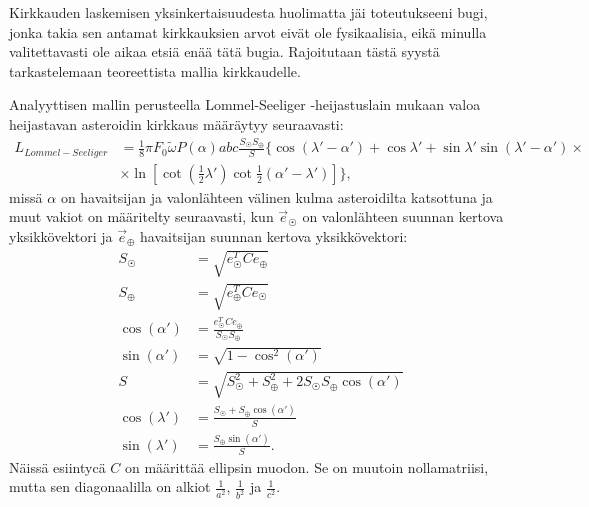 \documentclass[12pt,a4paper,titlepage]{article}
\begin{document}
Kirkkauden laskemisen yksinkertaisuudesta huolimatta jäi toteutukseeni bugi, jonka takia sen antamat kirkkauksien arvot eivät ole fysikaalisia, eikä minulla valitettavasti ole aikaa etsiä enää tätä bugia. Rajoitutaan tästä syystä tarkastelemaan teoreettista mallia kirkkaudelle.

Analyyttisen mallin perusteella Lommel-Seeliger -heijastuslain mukaan valoa heijastavan asteroidin kirkkaus määräytyy seuraavasti:
\begin{align}
	L_{Lommel-Seeliger} &= \frac{1}{8} \pi F_0 \widetilde{\omega} P(\alpha)abc\frac{S_{\astrosun} S_{\oplus}}{S} \{ \cos(\lambda'-\alpha') + \cos\lambda' + \sin \lambda' \sin(\lambda'-\alpha') \times\nonumber\\
	&\times\ln\left[\cot(\frac{1}{2}\lambda')\cot\frac{1}{2}(\alpha'-\lambda')\right] \},
\end{align}
missä $\alpha$ on havaitsijan ja valonlähteen välinen kulma asteroidilta katsottuna ja muut vakiot on määritelty seuraavasti, kun $\vec{e}_{\astrosun}$ on valonlähteen suunnan kertova yksikkövektori ja $\vec{e}_{\oplus}$ havaitsijan suunnan kertova yksikkövektori: 
\begin{align*}
	S_{\astrosun} &= \sqrt{e_{\astrosun}^TCe_{\oplus}} \\
	S_{\oplus} &= \sqrt{e_{\oplus}^TCe_{\astrosun}} \\
	\cos(\alpha') &= \frac{e_{\astrosun}^TCe_{\oplus}}{S_{\astrosun}S_{\oplus}} \\
	\sin(\alpha') &= \sqrt{1-\cos^2(\alpha')} \\
	S &= \sqrt{S_{\astrosun}^2+S_{\oplus}^2+2S_{\astrosun}S_{\oplus}\cos(\alpha')} \\
	\cos(\lambda') &= \frac{S_{\astrosun}+S_{\oplus}\cos(\alpha')}{S} \\
	\sin(\lambda') &= \frac{S_{\oplus}\sin(\alpha')}{S}.
\end{align*}
Näissä esiintycä $C$ on määrittää ellipsin muodon. Se on muutoin nollamatriisi, mutta sen diagonaalilla on alkiot $\frac{1}{a^2}$, $\frac{1}{b^2}$ ja $\frac{1}{c^2}$.

\newpage

\end{document}
